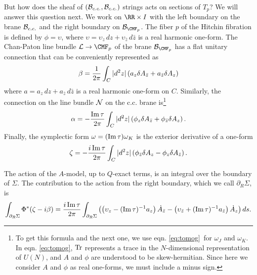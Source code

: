 \def\bz{{\bar z}}
\def\Im{{\rm Im}}
\def\bpartial{{\bar\partial}}
But how does the  sheaf of  $({\cal B}_{c.c.},{\cal
B}_{c.c.})$ strings acts on sections of $T_p$?  We will answer this question
next. We work on $\RR\times I$ with the left
boundary on the brane ${\cal B}_{c.c.}$ and the right boundary on
${\cal B}_{{\CMF}_p}$.  The fiber $p$ of the Hitchin fibration
is defined by $\phi=\upsilon$, where $\upsilon=\upsilon_z\,dz+\upsilon_\bz\,d\bz$ is a real
harmonic one-form. The Chan-Paton
line bundle ${\cal L}\to{\CMF}_p$ of the brane ${\cal
B}_{{\CMF}_p}$ has a flat unitary connection that can be
conveniently represented as %
\setcounter{equation}{16}
\begin{equation}\label{eq:zoncob}
\beta={1\over
{2\pi}}\int_C |d^2 z|\left(a_z \delta A_\bz+a_\bz \delta
A_z\right)
\end{equation}
 where $a=a_z\,dz+a_\bz\,d\bz$ is a real harmonic
one-form on $C$.   Similarly, the connection on the line bundle
${\cal N}$ on the c.c. brane is\footnote{To get this formula and the next one,
we use eqn. \eqref{eq:tomog}\ for $\omega_J$ and $\omega_K$.  In eqn. \eqref{eq:tomog}, ${\rm Tr}$ represents
a trace in the $N$-dimensional representation of $U(N)$, and $A$ and $\phi$ are understood
to be skew-hermitian.  Since here we consider $A$ and $\phi$ as real one-forms,
we must include a minus sign.} %
\setcounter{equation}{17}
\begin{equation}\label{eq:homifly}
\alpha=-{\Im\,\tau\over
2\pi}\int_C |d^2 z|\left(\phi_z \delta A_\bz+\phi_\bz \delta
A_z\right).
\end{equation}
 Finally, the symplectic form $\omega=({\Im}\,\tau)\omega_K$ is the
exterior derivative of a one-form %
\setcounter{equation}{18}
\begin{equation}\label{eq:nomigly}
\zeta=-{i\,
\Im\,\tau\over 2\pi}\int_C |d^2 z|\left(\phi_\bz \delta A_z-\phi_z
\delta A_\bz\right).
\end{equation}

The action of the $A$-model, up to $Q$-exact
terms, is an integral over the boundary of $\Sigma$. The contribution to the action from
the right
boundary, which we call $\partial_R\Sigma$, is  %
\setcounter{equation}{19}
\begin{equation}\label{eq:omitro}
\int_{\partial_R\Sigma}
\Phi^*(\zeta -i\beta)={i\,\Im\,\tau\over 2\pi}\int_{\partial_R\Sigma}
\left(\left(\upsilon_z-(\Im\,\tau)^{-1}a_z\right) \dot{A}_\bz
-\left(\upsilon_\bz+(\Im\,\tau)^{-1}a_\bz\right) \dot{A}_z\right)ds.
\end{equation}


